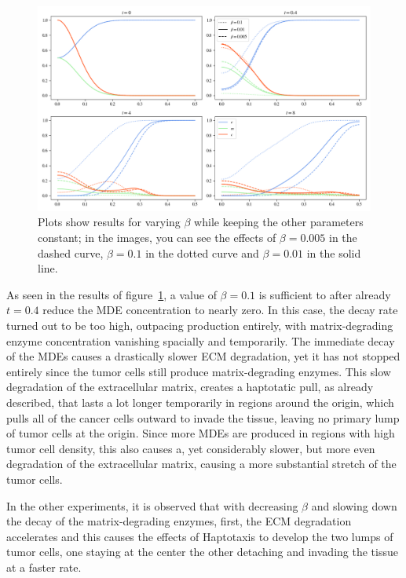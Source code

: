 \begin{figure}[h]
 \centering
 \includegraphics[width=\textwidth]{resources/images/beta_variation.png}
 \caption{Plots show results for varying $\beta$ while keeping the other parameters constant; in the images, you can see the effects of $\beta=0.005$ in the dashed curve, $\beta=0.1$ in the dotted curve and $\beta=0.01$ in the solid line.}
 \label{fig:beta_variation}
\end{figure}
As seen in the results of figure~\ref{fig:beta_variation}, a value of $\beta=0.1$ is sufficient to after already $t=0.4$ reduce the MDE concentration to nearly zero. In this case, the decay rate turned out to be too high, outpacing production entirely, with matrix-degrading enzyme concentration vanishing spacially and temporarily. The immediate decay of the MDEs causes a drastically slower ECM degradation, yet it has not stopped entirely since the tumor cells still produce matrix-degrading enzymes. This slow degradation of the extracellular matrix, creates a haptotatic pull, as already described, that lasts a lot longer temporarily in regions around the origin, which pulls all of the cancer cells outward to invade the tissue, leaving no primary lump of tumor cells at the origin. Since more MDEs are produced in regions with high tumor cell density, this also causes a, yet considerably slower, but more even degradation of the extracellular matrix, causing a more substantial stretch of the tumor cells.

In the other experiments, it is observed that with decreasing $\beta$ and slowing down the decay of the matrix-degrading enzymes, first, the ECM degradation accelerates and this causes the effects of Haptotaxis to develop the two lumps of tumor cells, one staying at the center the other detaching and invading the tissue at a faster rate.


